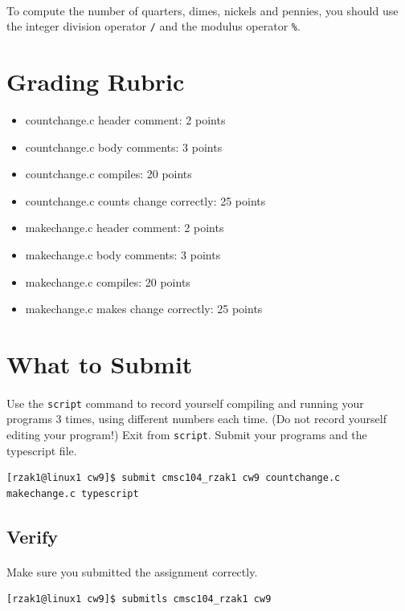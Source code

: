 \documentclass[letter,11pt]{article}
\begin{document}
\paragraph{}To compute the number of quarters, dimes, nickels and pennies, you should use the integer division operator \texttt{/} and the modulus operator \texttt{\%}.

\section*{Grading Rubric}
\begin{itemize}
    \item countchange.c header comment: 2 points
    \item countchange.c body comments: 3 points
    \item countchange.c compiles: 20 points
    \item countchange.c counts change correctly: 25 points
    \item makechange.c header comment: 2 points
    \item makechange.c body comments: 3 points
    \item makechange.c compiles: 20 points
    \item makechange.c makes change correctly: 25 points
\end{itemize}

\section*{What to Submit}
\paragraph{}Use the \texttt{script} command to record yourself compiling and running your programs 3 times, using different numbers each time. (Do not record yourself editing your program!) Exit from \texttt{script}. Submit your programs and the typescript file.

\begin{verbatim}
[rzak1@linux1 cw9]$ submit cmsc104_rzak1 cw9 countchange.c makechange.c typescript
\end{verbatim}

\subsection*{Verify}
\paragraph{}Make sure you submitted the assignment correctly.
\begin{verbatim}
[rzak1@linux1 cw9]$ submitls cmsc104_rzak1 cw9
\end{verbatim}
\end{document}
